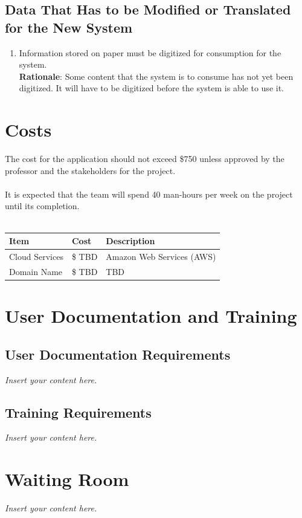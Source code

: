 \documentclass[12pt]{article}
\newcommand{\lips}{\textit{Insert your content here.}}
\begin{document}
\subsection{Data That Has to be Modified or Translated for the New System}
\begin{enumerate} [{MI-TR}1.]
  \item Information stored on paper must be digitized for consumption for the
    system.\\
    \textbf{Rationale}: Some content that the system is to consume has not yet
    been digitized. It will have to be digitized before the system is able to
    use it.
\end{enumerate}

\section{Costs}
The cost for the application should not exceed \$750 unless approved by the professor and
the stakeholders for the project.\\
\\
It is expected that the team will spend 40 man-hours per week on the project until its completion.\\
\\
\begin{tabularx}{\textwidth}{p{3cm}p{2cm}X}
  \toprule {\textbf{Item}} & {\textbf{Cost}} & {\textbf{Description}}\\
  \midrule
  Cloud Services   & \$ TBD     & Amazon Web Services (AWS) \\ 
  Domain Name      & \$ TBD     & TBD           \\ 
  \bottomrule
  \end{tabularx}
 

\section{User Documentation and Training}
\subsection{User Documentation Requirements}
\lips
\subsection{Training Requirements}
\lips

\section{Waiting Room}
\lips
\end{document}
